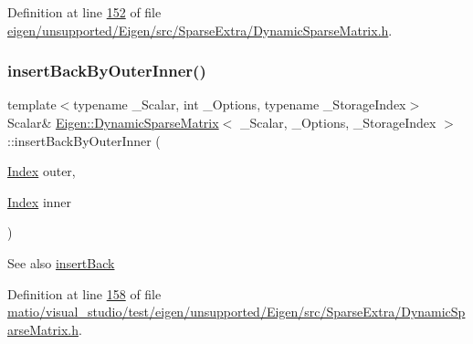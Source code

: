 Definition at line \hyperlink{eigen_2unsupported_2_eigen_2src_2_sparse_extra_2_dynamic_sparse_matrix_8h_source_l00152}{152} of file \hyperlink{eigen_2unsupported_2_eigen_2src_2_sparse_extra_2_dynamic_sparse_matrix_8h_source}{eigen/unsupported/\+Eigen/src/\+Sparse\+Extra/\+Dynamic\+Sparse\+Matrix.\+h}.

\mbox{\label{class_eigen_1_1_dynamic_sparse_matrix_ac97c2463058ae55d7f0ef21c851eb5f3}} 
\subsubsection{\texorpdfstring{insert\+Back\+By\+Outer\+Inner()}{insertBackByOuterInner()}\hspace{0.1cm}{\footnotesize\ttfamily [1/2]}}
{\footnotesize\ttfamily template$<$typename \+\_\+\+Scalar, int \+\_\+\+Options, typename \+\_\+\+Storage\+Index$>$ \\
Scalar\& \hyperlink{class_eigen_1_1_dynamic_sparse_matrix}{Eigen\+::\+Dynamic\+Sparse\+Matrix}$<$ \+\_\+\+Scalar, \+\_\+\+Options, \+\_\+\+Storage\+Index $>$\+::insert\+Back\+By\+Outer\+Inner (\begin{DoxyParamCaption}\item[{\hyperlink{group___core___module_a554f30542cc2316add4b1ea0a492ff02}{Index}}]{outer,  }\item[{\hyperlink{group___core___module_a554f30542cc2316add4b1ea0a492ff02}{Index}}]{inner }\end{DoxyParamCaption})\hspace{0.3cm}{\ttfamily [inline]}}

\begin{DoxySeeAlso}{See also}
\hyperlink{class_eigen_1_1_dynamic_sparse_matrix_a0a556652195b91c09e9f6c4d8b7cc81d}{insert\+Back} 
\end{DoxySeeAlso}


Definition at line \hyperlink{matio_2visual__studio_2test_2eigen_2unsupported_2_eigen_2src_2_sparse_extra_2_dynamic_sparse_matrix_8h_source_l00158}{158} of file \hyperlink{matio_2visual__studio_2test_2eigen_2unsupported_2_eigen_2src_2_sparse_extra_2_dynamic_sparse_matrix_8h_source}{matio/visual\+\_\+studio/test/eigen/unsupported/\+Eigen/src/\+Sparse\+Extra/\+Dynamic\+Sparse\+Matrix.\+h}.


